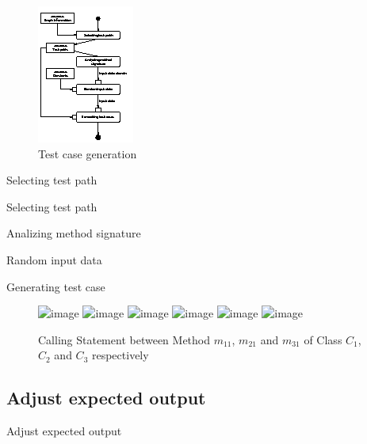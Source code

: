 \documentclass{beamer}
\begin{document}
\begin{frame}
    \begin{figure}
        \includegraphics[height=.8\paperheight]{figure/Activities}
        \caption{Test case generation}
        \label{fig:testcasegenearation}
    \end{figure}
\end{frame}

\begin{frame}{Selecting test path}
\end{frame}

\begin{frame}{Selecting test path}
\end{frame}

\begin{frame}{Analizing method signature}
\end{frame}

\begin{frame}{Random input data}
\end{frame}

\begin{frame}{Generating test case}
    \begin{figure}
        \includegraphics<1>[height=.6\paperheight]{figure/Calling-statements-of-Classes}
        \includegraphics<2>[height=.6\paperheight]{figure/Calling-statements-of-Classes-1}
        \includegraphics<3>[height=.6\paperheight]{figure/Calling-statements-of-Classes-2}
        \includegraphics<4>[height=.6\paperheight]{figure/Calling-statements-of-Classes-3}
        \includegraphics<5>[height=.6\paperheight]{figure/Calling-statements-of-Classes-4}
        \includegraphics<6>[height=.6\paperheight]{figure/Calling-statements-of-Classes-5}
        \caption{Calling Statement between Method $m_{11}$, $m_{21}$ and $m_{31}$ of Class $C_1$, $C_2$ and $C_3$ respectively }
        \label{fig:testcasegenearation}
    \end{figure}
\end{frame}

\subsection{Adjust expected output}
\begin{frame}{Adjust expected output}
\end{frame}
\end{document}

